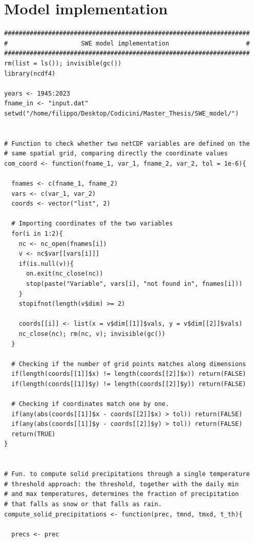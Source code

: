 \chapter{Model implementation}
\label{app:model_impl}

\begin{lstlisting}[style=Rcode, caption={Model implementation. This code was used to generate the SWE maps.}, label={lst:swe}]
###################################################################
#                    SWE model implementation                     #
###################################################################
rm(list = ls()); invisible(gc())
library(ncdf4)

years <- 1945:2023
fname_in <- "input.dat"
setwd("/home/filippo/Desktop/Codicini/Master_Thesis/SWE_model/")


# Function to check whether two netCDF variables are defined on the 
# same spatial grid, comparing directly the coordinate values
com_coord <- function(fname_1, var_1, fname_2, var_2, tol = 1e-6){
  
  fnames <- c(fname_1, fname_2)
  vars <- c(var_1, var_2)
  coords <- vector("list", 2)
  
  # Importing coordinates of the two variables
  for(i in 1:2){
    nc <- nc_open(fnames[i])
    v <- nc$var[[vars[i]]]
    if(is.null(v)){
      on.exit(nc_close(nc))
      stop(paste("Variable", vars[i], "not found in", fnames[i]))
    }
    stopifnot(length(v$dim) >= 2)
    
    coords[[i]] <- list(x = v$dim[[1]]$vals, y = v$dim[[2]]$vals)
    nc_close(nc); rm(nc, v); invisible(gc())
  }
  
  # Checking if the number of grid points matches along dimensions
  if(length(coords[[1]]$x) != length(coords[[2]]$x)) return(FALSE)
  if(length(coords[[1]]$y) != length(coords[[2]]$y)) return(FALSE)
  
  # Checking if coordinates match one by one.
  if(any(abs(coords[[1]]$x - coords[[2]]$x) > tol)) return(FALSE)
  if(any(abs(coords[[1]]$y - coords[[2]]$y) > tol)) return(FALSE)
  return(TRUE)
}


# Fun. to compute solid precipitations through a single temperature
# threshold approach: the threshold, together with the daily min 
# and max temperatures, determines the fraction of precipitation 
# that falls as snow or that falls as rain.
compute_solid_precipitations <- function(prec, tmnd, tmxd, t_th){
  
  precs <- prec 
  

\end{lstlisting}
